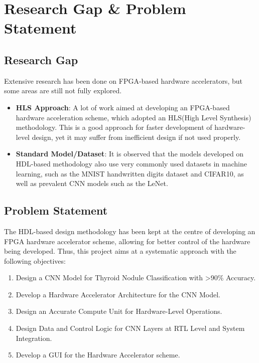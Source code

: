 
\setlength{\parindent}{2em}
\chapter{Research Gap \& Problem Statement}
\section{Research Gap}
    \noindent Extensive research has been done on FPGA-based hardware accelerators, but some areas are still not fully explored.

    \begin{itemize}
        \item \textbf{HLS Approach}: A lot of work aimed at developing an FPGA-based hardware acceleration scheme, which adopted an HLS(High Level Synthesis) methodology. This is a good approach for faster development of hardware-level design, yet it may suffer from inefficient design if not used properly.

        \item \textbf{Standard Model/Dataset}: It is observed that the models developed on HDL-based methodology also use very commonly used datasets in machine learning, such as the MNIST handwritten digits dataset and CIFAR10, as well as prevalent CNN models such as the LeNet.
    \end{itemize}
\section{Problem Statement}
\noindent
The HDL-based design methodology has been kept at the centre of developing an FPGA hardware accelerator scheme, allowing for better control of the hardware being developed. Thus, this project aims at a systematic approach with the following objectives:
\begin{enumerate}
    \item Design a CNN Model for Thyroid Nodule Classification with \textgreater 90\% Accuracy.
    \item Develop a Hardware Accelerator Architecture for the CNN Model.
    \item Design an Accurate Compute Unit for Hardware-Level Operations.
    \item Design Data and Control Logic for CNN Layers at RTL Level and System Integration.
    \item Develop a GUI for the Hardware Accelerator scheme.
\end{enumerate}
\newpage